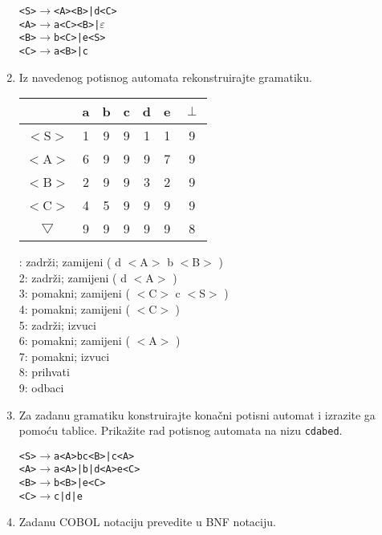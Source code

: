 \documentclass[times, 12pt, utf8]{book}
\begin{document}
\begin{enumerate}[resume]
\begin{alltt}
<S> \(\to\) <A><B> | d<C>
<A> \(\to\) a<C><B> | \(\varepsilon\)
<B> \(\to\) b<C> | e<S>
<C> \(\to\) a<B> | c
\end{alltt} 

\item
Iz navedenog potisnog automata rekonstruirajte gramatiku. \cite[str.~94-95]{udzbenik} \cite{auditorne}

\begin{tabular}{| c | c | c | c | c | c | c | }
\hline
 & a & b & c & d & e & $\perp$ \\ \hline
$<$S$>$ & 1 & 9 & 9 & 1 & 1 & 9 \\ \hline
$<$A$>$ & 6 & 9 & 9 & 9 & 7 & 9 \\ \hline
$<$B$>$ & 2 & 9 & 9 & 3 & 2 & 9 \\ \hline
$<$C$>$ & 4 & 5 & 9 & 9 & 9 & 9 \\ \hline
$\bigtriangledown$ & 9 & 9 & 9 & 9 & 9 & 8 \\ \hline
\end{tabular}

: zadrži;	zamijeni ( d $<$A$>$ b $<$B$>$ ) \\
2: zadrži;	zamijeni ( d $<$A$>$ ) \\
3: pomakni;	zamijeni ( $<$C$>$ c $<$S$>$ ) \\
4: pomakni;	zamijeni ( $<$C$>$ ) \\
5: zadrži;	izvuci \\
6: pomakni;	zamijeni ( $<$A$>$ ) \\
7: pomakni;	izvuci \\
8: prihvati \\
9: odbaci \\

\item
Za zadanu gramatiku konstruirajte konačni potisni automat i izrazite ga pomoću tablice.
Prikažite rad potisnog automata na nizu \texttt{cdabed}. \cite[str.~94-95]{udzbenik} \cite{auditorne}

\begin{alltt}
<S> \(\to\) a<A>bc<B> | c<A>
<A> \(\to\) a<A> | b | d<A>e<C>
<B> \(\to\) b<B> | e<C>
<C> \(\to\) c | d | e
\end{alltt} 

\item 
Zadanu COBOL notaciju prevedite u BNF notaciju. \cite[str.~81-82]{udzbenik}


\end{enumerate}
\end{document}
